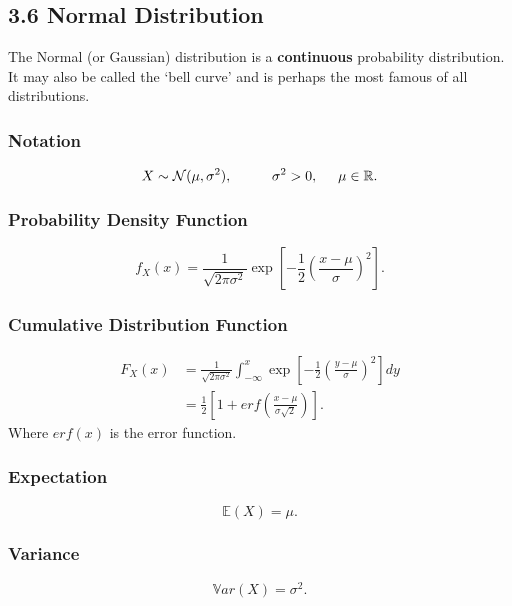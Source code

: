 \documentclass[11pt]{article}
\begin{document}
\subsection*{3.6 Normal Distribution}
The Normal (or Gaussian) distribution is a \textbf{continuous} probability distribution. It may also be called the `bell curve' and is perhaps the most famous of all distributions. 

\subsubsection*{Notation}
\begin{equation}
    X \sim \mathcal{N}(\mu, \sigma^2), \hspace{1cm} \sigma^2 >0, \hspace{0.5cm} \mu \in \mathbb{R}.
\end{equation}

\subsubsection*{Probability Density Function}
\begin{equation}
    f_X(x) = \frac{1}{\sqrt{2 \pi \sigma^2}} \exp \left[ -\frac{1}{2} \left( \frac{x - \mu}{\sigma}\right)^2 \right].
\end{equation}

\subsubsection*{Cumulative Distribution Function}
\begin{align}
    F_X(x) &= \frac{1}{\sqrt{2 \pi \sigma^2}} \int_{-\infty}^{x} \exp \left[ -\frac{1}{2} \left( \frac{y - \mu}{\sigma}\right)^2 \right] dy \\
    &= \frac{1}{2}\left[ 1 + erf \left( \frac{x - \mu}{\sigma \sqrt{2}}\right)  \right].
\end{align}
Where $erf(x)$ is the error function.

\subsubsection*{Expectation}
\begin{equation}
    \mathbb{E}(X) = \mu.
\end{equation}

\subsubsection*{Variance}
\begin{equation}
    \mathbb{V}ar(X) = \sigma^2.
\end{equation}
\end{document}
